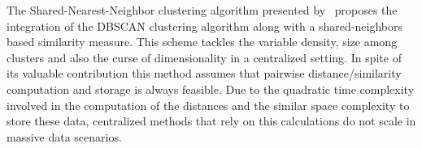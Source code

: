 \documentclass[10pt]{article}
\begin{document}
The Shared-Nearest-Neighbor clustering algorithm presented by~\citep{ESK03} proposes the integration of the DBSCAN clustering algorithm along with a shared-neighbors based similarity measure. 
This scheme tackles the variable density, size among clusters and also the curse of dimensionality in a centralized setting. 
In spite of its valuable contribution this method assumes that pairwise distance/similarity computation and storage is always feasible. 
Due to the quadratic time complexity involved in the computation of the distances and the similar space complexity to store these data, centralized methods that rely on this calculations do not scale in massive data scenarios.  

\end{document}
